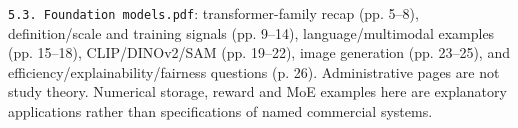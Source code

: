 \documentclass[11pt]{article}
\begin{document}
\texttt{5.3. Foundation models.pdf}: transformer-family recap (pp. 5--8), definition/scale and training signals (pp. 9--14), language/multimodal examples (pp. 15--18), CLIP/DINOv2/SAM (pp. 19--22), image generation (pp. 23--25), and efficiency/explainability/fairness questions (p. 26). Administrative pages are not study theory. Numerical storage, reward and MoE examples here are explanatory applications rather than specifications of named commercial systems.
\end{document}
